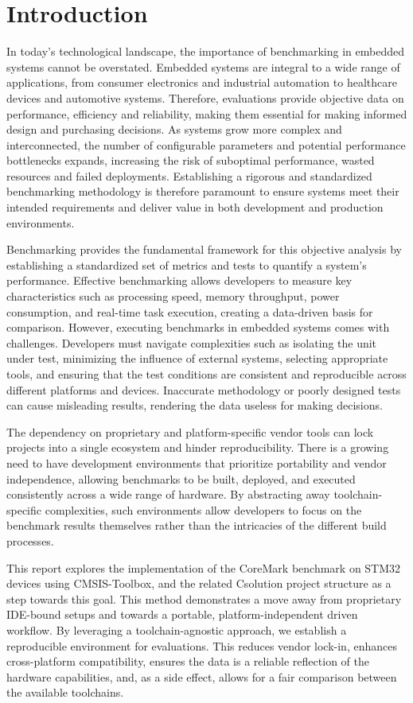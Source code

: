 \chapter*{Introduction}

In today's technological landscape, the importance of benchmarking in embedded systems cannot be overstated. Embedded systems are integral to a wide range of applications, from consumer electronics and industrial automation to healthcare devices and automotive systems. Therefore, evaluations provide objective data on performance, efficiency and reliability, making them essential for making informed design and purchasing decisions. As systems grow more complex and interconnected, the number of configurable parameters and potential performance bottlenecks expands, increasing the risk of suboptimal performance, wasted resources and failed deployments. Establishing a rigorous and standardized benchmarking methodology is therefore paramount to ensure systems meet their intended requirements and deliver value in both development and production environments.

Benchmarking provides the fundamental framework for this objective analysis by establishing a standardized set of metrics and tests to quantify a system's performance. Effective benchmarking allows developers to measure key characteristics such as processing speed, memory throughput, power consumption, and real-time task execution, creating a data-driven basis for comparison. However, executing benchmarks in embedded systems comes with challenges. Developers must navigate complexities such as isolating the unit under test, minimizing the influence of external systems, selecting appropriate tools, and ensuring that the test conditions are consistent and reproducible across different platforms and devices. Inaccurate methodology or poorly designed tests can cause misleading results, rendering the data useless for making decisions.

The dependency on proprietary and platform-specific vendor tools can lock projects into a single ecosystem and hinder reproducibility. There is a growing need to have development environments that prioritize portability and vendor independence, allowing benchmarks to be built, deployed, and executed consistently across a wide range of hardware. By abstracting away toolchain-specific complexities, such environments allow developers to focus on the benchmark results themselves rather than the intricacies of the different build processes.

This report explores the implementation of the CoreMark benchmark on STM32 devices using CMSIS-Toolbox, and the related Csolution project structure as a step towards this goal. This method demonstrates a move away from proprietary IDE-bound setups and towards a portable, platform-independent driven workflow. By leveraging a toolchain-agnostic approach, we establish a reproducible environment for evaluations. This reduces vendor lock-in, enhances cross-platform compatibility, ensures the data is a reliable reflection of the hardware capabilities, and, as a side effect, allows for a fair comparison between the available toolchains.